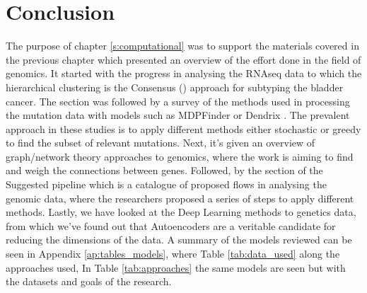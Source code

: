





\section{Conclusion}

The purpose of chapter \ref{s:computational} was to support the materials covered in the previous chapter which presented an overview of the effort done in the field of genomics. It started with the progress in analysing the RNAseq data to which the hierarchical clustering is the Consensus (\citet{Kamoun2020-tj}) approach for subtyping the bladder cancer. The section was followed by a survey of the methods used in processing the mutation data with models such as MDPFinder \citet{Zhao2012-wj} or Dendrix \citet{Vandin2012-cf}. The prevalent approach in these studies is to apply different methods either stochastic or greedy to find the subset of relevant mutations. Next, it's given an overview of graph/network theory approaches to genomics, where the work is aiming to find and weigh the connections between genes. Followed, by the section of the Suggested pipeline which is a catalogue of proposed flows in analysing the genomic data, where the researchers proposed a series of steps to apply different methods. Lastly, we have looked at the Deep Learning methods to genetics data, from which we've found out that Autoencoders are a veritable candidate for reducing the dimensions of the data. A summary of the models reviewed can be seen in Appendix \ref{ap:tables_models}, where Table \ref{tab:data_used} along the approaches used, In Table \ref{tab:approaches} the same models are seen but with the datasets and goals of the research.

